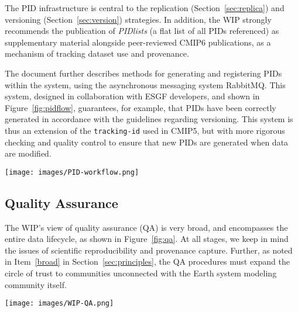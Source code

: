 \documentclass[gmd,manuscript]{copernicus}
\newcommand{\figref}[1] {\mbox{Figure   \ref{fig:#1}}}
\newcommand{\secref}[1] {\mbox{Section  \ref{sec:#1}}}
\begin{document}
The PID infrastructure is central to the replication
(\secref{replica}) and versioning (\secref{version}) strategies. In
addition, the WIP strongly recommends the publication of
\emph{PIDlists} (a flat list of all PIDs referenced) as supplementary
material alongside peer-reviewed CMIP6 publications, as a mechanism of
tracking dataset use and provenance.

The document further describes methods for generating and registering
PIDs within the system, using the asynchronous messaging system
RabbitMQ. This system, designed in collaboration with ESGF developers,
and shown in \figref{pidflow}, guarantees, for example, that PIDs have
been correctly generated in accordance with the guidelines regarding
versioning. This system is thus an extension of the
\texttt{tracking-id} used in CMIP5, but with more rigorous checking
and quality control to ensure that new PIDs are generated when data
are modified.

\begin{figure*}
  \begin{center}
    \texttt{[image: images/PID-workflow.png]}
  \end{center}
  \caption{PID workflow, showing the generation and registry of PIDs,
    with checkpoints where compliance is assured. Figure courtesy
    Tobias Weigel.}
  \label{fig:pidflow}
\end{figure*}

\subsection{Quality Assurance}
\label{sec:qa}

The WIP's view of quality assurance (QA) is very broad, and
encompasses the entire data lifecycle, as shown in \figref{qa}. At all
stages, we keep in mind the issues of scientific reproducibility and
provenance capture. Further, as noted in Item~\ref{broad} in
\secref{principles}, the QA procedures must expand the circle of trust
to communities unconnected with the Earth system modeling community
itself.


\begin{figure*}
  \begin{center}
    \texttt{[image: images/WIP-QA.png]}
  \end{center}
  \caption{Schematic of the phases of quality assurance, with earlier
    stages in the hands of modeling centres (left), and more formal
    long-term data curation stages at right. Quality assurance is
    applied both to the data (D, above) as well as the metadata (M)
    describing the data. Figure courtesy Martina Stockhause, drawn
    from the WIP's Quality Assurance position paper.}
  \label{fig:qa}
\end{figure*}
\end{document}
